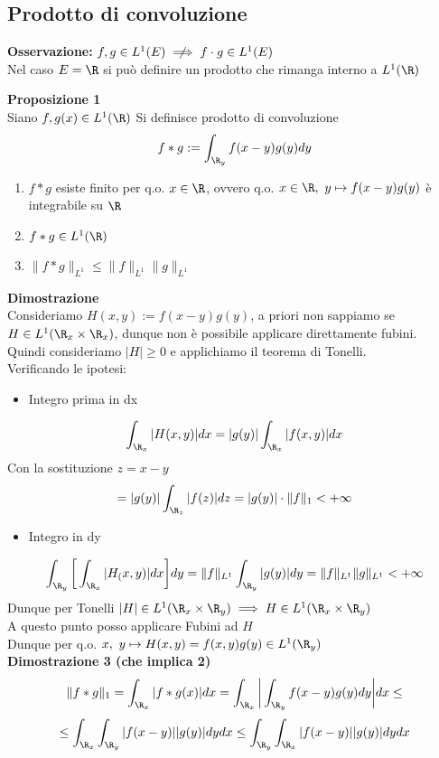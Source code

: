 \subsection{Prodotto di convoluzione}
\textbf{Osservazione: }$f,g\in L^{1}(E)\centernot\implies f\cdot g\in L^{1}(E)$
\\Nel caso $E=\R$ si può definire un prodotto che rimanga interno a $L^{1}(\R)$ 
\begin{tcolorbox}
	\textbf{Proposizione 1} 
	\\Siano $f,g(x)\in L^{1}(\R)$ Si definisce prodotto di convoluzione
	\[ f*g:=\int_{\R_y}^{} f(x-y)g(y)dy\] 
\end{tcolorbox}
\begin{enumerate}
	\item $f*g$ esiste finito per q.o. $x\in \R$, ovvero q.o. $x\in \R,\ y\mapsto f(x-y)g(y)$ è integrabile su $\R$
	\item$f*g \in L^{1}(\R)$
	\item$\|f*g\|_{L^1}\le \|f\|_{L^1}\|g\|_{L^1}$ 
\end{enumerate}
\textbf{Dimostrazione} 
\\Consideriamo $H(x,y):=f(x-y)g(y)$, a priori non sappiamo se $H\in L^{1}(\R_x \times \R_x)$, dunque non è possibile applicare direttamente fubini.
\\Quindi consideriamo $|H|\ge 0$ e applichiamo il teorema di Tonelli.
\\Verificando le ipotesi:
\begin{itemize}
	\item Integro prima in dx
\end{itemize}
\[\int_{\R_x}^{} |H(x,y)|dx=|g(y)|\int_{\R_x}^{}|f(x,y)|dx\]   
Con la sostituzione $z=x-y$ 
\[=|g(y)|\int_{\R_z}^{} |f(z)|dz=|g(y)|\cdot \|f\|_1<+\infty\] 
\begin{itemize}
	\item Integro in dy
\end{itemize}
\[\int_{\R_y}^{} \bigg[\int_{\R_x}^{} |H_(x,y)|dx\bigg]dy=\|f\|_{L^1}\int_{\R_y}^{} |g(y)|dy=\|f\|_{L^1}\|g\|_{L^1}<+\infty\]
Dunque per Tonelli $|H|\in L^{1}(\R_x \times \R_y)\implies H\in L^1(\R_x \times \R_y)$
\\A questo punto posso applicare Fubini ad $H$ 
\\Dunque per q.o. $x,\ y\mapsto H(x,y)=f(x,y)g(y)\in L^{1}(\R_y)$
\\\textbf{Dimostrazione 3 (che implica 2)}
\[\|f*g\|_{1}=\int_{\R_x}^{} |f*g(x)|dx=\int_{\R_x}^{} \bigg|\int_{\R_y}^{} f(x-y)g(y)dy\bigg|dx\le \]
\[\le \int_{\R_x}^{} \int_{\R_y}{|f(x-y)| |g(y)|dydx}\le \int_{\R_y}^{} \int_{\R_x}{|f(x-y)| |g(y)|dydx}\]

